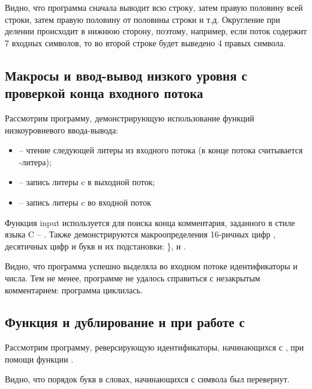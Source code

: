 Видно, что программа сначала выводит всю строку, затем правую половину всей строки, затем правую половину от половины строки и т.д. Округление при делении  происходит в нижнюю сторону, поэтому, например, если поток содержит 7 входных символов, то во второй строке будет выведено 4 правых символа.

\subsection{Макросы и ввод-вывод низкого уровня с проверкой конца входного потока}

Рассмотрим программу, демонстрирующую использование функций низкоуровневого ввода-вывода:

\begin{itemize}
	\item {} -- чтение следующей литеры из входного потока (в конце потока считывается -литера);
	\item {} -- запись литеры c в выходной поток;
	\item {} -- запись литеры c во входной поток
\end{itemize}

Функция input используется для поиска конца комментария, заданного в стиле языка C -- \code{/* */}. Также демонстрируются макроопределения 16-ричных цифр , десятичных цифр  и букв  и их подстановки: \},  и .



Видно, что программа успешно выделяла во входном потоке идентификаторы и числа. Тем не менее, программе не удалось справиться с незакрытым комментарием: программа циклилась.

\subsection{Функция  и дублирование  и  при работе с }

Рассмотрим программу, реверсирующую идентификаторы, начинающихся с , при помощи функции .



Видно, что порядок букв в словах, начинающихся с символа  был перевернут.

